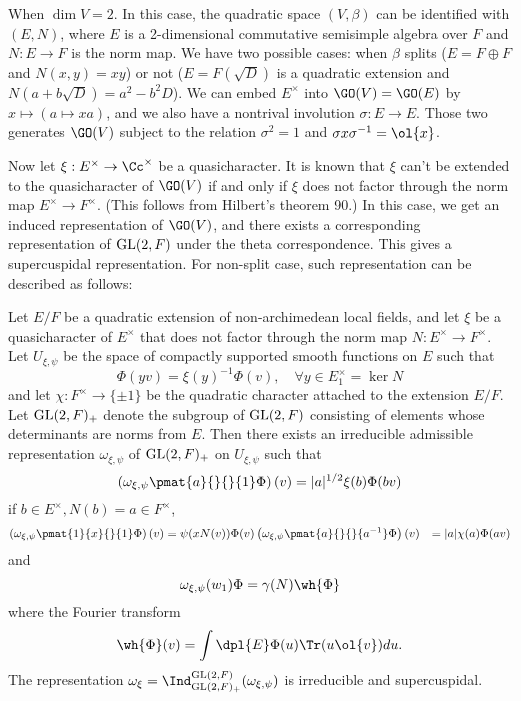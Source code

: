 When $\dim V = 2$. In this case, the quadratic space $(V, \beta)$ can be identified with $(E, N)$, where $E$ is a 2-dimensional commutative semisimple algebra over $F$ and $N:E\to F$ is the norm map. 
We have two possible cases: when $\beta$ splits ($E = F\oplus F$ and $N(x, y) = xy$) or not ($E = F(\sqrt{D})$ is a quadratic extension and $N(a+b\sqrt{D}) = a^{2} - b^{2}D$). 
We can embed $E^{\times}$ into $\GO(V) = \GO(E)$ by $x\mapsto (a\mapsto xa)$, and we also have a nontrival involution $\sigma:E\to E$. Those two generates $\GO(V)$ subject to the relation $\sigma^{2} =1$ and $\sigma x \sigma^{-1} = \ol{x}$. 

Now let $\xi:E^{\times} \to \Cc^{\times}$ be a quasicharacter. It is known that $\xi$ can't be extended to the quasicharacter of $\GO(V)$ if and only if $\xi$ does not factor through the norm map $E^{\times} \to F^{\times}$. (This follows from Hilbert's theorem 90.) 
In this case, we get an induced representation of $\GO(V)$, and there exists a corresponding representation of $\mathrm{GL}(2, F)$ under the theta correspondence. This gives a supercuspidal representation. For non-split case, such representation can be described as follows:
\begin{theorem}
Let $E/F$ be a quadratic extension of non-archimedean local fields, and let $\xi$ be a quasicharacter of $E^{\times}$ that does not factor through the norm map $N:E^{\times} \to F^{\times}$. 
Let $U_{\xi, \psi}$ be the space of compactly supported smooth functions on $E$ such that 
$$
\Phi(yv) = \xi(y)^{-1}\Phi(v), \quad \forall y\in E_{1}^{\times} = \ker N
$$
and let $\chi: F^{\times} \to \{\pm 1\}$ be the quadratic character attached to the extension $E/F$. 
Let $\mathrm{GL}(2, F)_{+}$ denote the subgroup of $\mathrm{GL}(2, F)$ consisting of elements whose determinants are norms from $E$. 
Then there exists an irreducible admissible representation $\omega_{\xi, \psi}$ of $\mathrm{GL}(2, F)_{+}$ on $U_{\xi, \psi}$ such that 
$$
\left(\omega_{\xi, \psi}\pmat{a}{}{}{1} \Phi\right)(v) = |a|^{1/2} \xi(b) \Phi(bv)
$$
if $b\in E^{\times}, N(b) = a\in F^{\times}$, 
\begin{align*}
\left(\omega_{\xi, \psi}\pmat{1}{x}{}{1} \Phi\right)(v) &= \psi(xN(v)) \Phi(v)
\left(\omega_{\xi, \psi}\pmat{a}{}{}{a^{-1}} \Phi\right)(v) &= |a|\chi(a)\Phi(av)
\end{align*}
and
$$
\omega_{\xi, \psi}(w_{1})\Phi = \gamma(N)\wh{\Phi}
$$
where the Fourier transform
$$
\wh{\Phi}(v) = \int\dpl{E} \Phi(u) \Tr(u\ol{v}) du.
$$
The representation $\omega_{\xi} = \Ind_{\GL(2, F)_{+}}^{\GL(2, F)}(\omega_{\xi, \psi})$  is irreducible and supercuspidal. 
\end{theorem}
